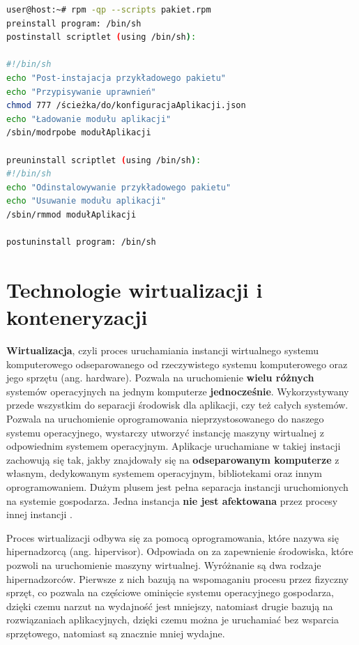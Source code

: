 \begin{lstlisting}[label={lis:skryptRPM}, language=bash, caption={Skrypty pakietu RPM}]
user@host:~# rpm -qp --scripts pakiet.rpm
preinstall program: /bin/sh
postinstall scriptlet (using /bin/sh):

#!/bin/sh
echo "Post-instajacja przykładowego pakietu"
echo "Przypisywanie uprawnień"
chmod 777 /ścieżka/do/konfiguracjaAplikacji.json
echo "Ładowanie modułu aplikacji"
/sbin/modrpobe modułAplikacji

preuninstall scriptlet (using /bin/sh):
#!/bin/sh
echo "Odinstalowywanie przykładowego pakietu"
echo "Usuwanie modułu aplikacji"
/sbin/rmmod modułAplikacji

postuninstall program: /bin/sh
\end{lstlisting}

\section{Technologie wirtualizacji i konteneryzacji}

\textbf{Wirtualizacja}, czyli proces uruchamiania instancji wirtualnego systemu komputerowego odseparowanego od rzeczywistego systemu komputerowego oraz jego sprzętu (ang. hardware). Pozwala na uruchomienie \textbf{wielu różnych} systemów operacyjnych na jednym komputerze \textbf{jednocześnie}. Wykorzystywany przede wszystkim do separacji środowisk dla aplikacji, czy też całych systemów. Pozwala na uruchomienie oprogramowania nieprzystosowanego do naszego systemu operacyjnego, wystarczy utworzyć instancję maszyny wirtualnej z odpowiednim systemem operacyjnym. Aplikacje uruchamiane w takiej instacji zachowują się tak, jakby znajdowały się na \textbf{odseparowanym komputerze} z własnym, dedykowanym systemem operacyjnym, bibliotekami oraz innym oprogramowaniem. Dużym plusem jest pełna separacja instancji uruchomionych na systemie gospodarza. Jedna instancja \textbf{nie jest afektowana} przez procesy innej instancji \cite{Virt}.\par

Proces wirtualizacji odbywa się za pomocą oprogramowania, które nazywa się hipernadzorcą (ang. hipervisor). Odpowiada on za zapewnienie środowiska, które pozwoli na uruchomienie maszyny wirtualnej. Wyróżnanie są dwa rodzaje hipernadzorców. Pierwsze z nich bazują na wspomaganiu procesu przez fizyczny sprzęt, co pozwala na częściowe ominięcie systemu operacyjnego gospodarza, dzięki czemu narzut na wydajność jest mniejszy, natomiast drugie bazują na rozwiązaniach aplikacyjnych, dzięki czemu można je uruchamiać bez wsparcia sprzętowego, natomiast są znacznie mniej wydajne.

